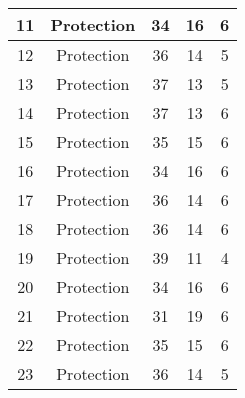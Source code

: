 \documentclass[results.tex]{subfiles}
\begin{document}
\begin{center}
\begin{tabular}{| c || c | c | c | c |}
            \hline
            11                      & Protection                   & 34                     & 16                      & 6                    \\
            \hline
            12                      & Protection                   & 36                     & 14                      & 5                    \\
            \hline
            13                      & Protection                   & 37                     & 13                      & 5                    \\
            \hline
            14                      & Protection                   & 37                     & 13                      & 6                    \\
            \hline
            15                      & Protection                   & 35                     & 15                      & 6                    \\
            \hline
            16                      & Protection                   & 34                     & 16                      & 6                    \\
            \hline
            17                      & Protection                   & 36                     & 14                      & 6                    \\
            \hline
            18                      & Protection                   & 36                     & 14                      & 6                    \\
            \hline
            19                      & Protection                   & 39                     & 11                      & 4                    \\
            \hline
            20                      & Protection                   & 34                     & 16                      & 6                    \\
            \hline
            21                      & Protection                   & 31                     & 19                      & 6                    \\
            \hline
            22                      & Protection                   & 35                     & 15                      & 6                    \\
            \hline
            23                      & Protection                   & 36                     & 14                      & 5                    \\

\end{tabular}
\end{center}
\end{document}

